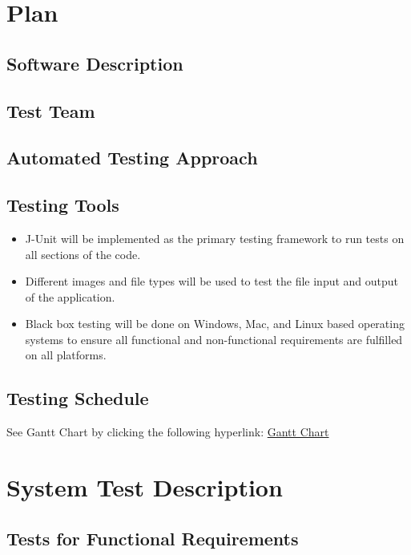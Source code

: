 \documentclass[12pt, titlepage]{article}
\begin{document}
\section{Plan}
	
\subsection{Software Description}

\subsection{Test Team}

\subsection{Automated Testing Approach}

\subsection{Testing Tools}
\begin{itemize}
\item J-Unit will be implemented as the primary testing framework to run tests on all sections of the code.
\item Different images and file types will be used to test the file input and output of the application.
\item Black box testing will be done on Windows, Mac, and Linux based operating systems to ensure all functional and non-functional requirements are fulfilled on all platforms.
\end{itemize}

\subsection{Testing Schedule}
		
See Gantt Chart by clicking the following hyperlink: 
\href{https://gitlab.cas.mcmaster.ca/dimitn/image_processing_app/tree/master/ProjectSchedule}{Gantt Chart}

\section{System Test Description}
	
\subsection{Tests for Functional Requirements}
\end{document}
